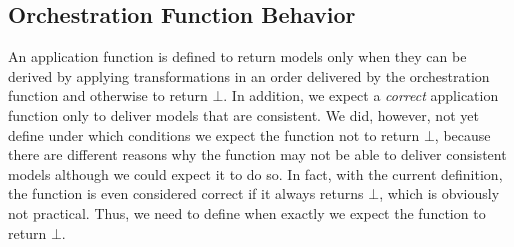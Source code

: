 \subsection{Orchestration Function Behavior} %
\label{chap:orchestration:problem:function_behavior}

An application function is defined to return models only when they can be derived by applying transformations in an order delivered by the orchestration function and otherwise to return $\bot$.
In addition, we expect a \emph{correct} application function only to deliver models that are consistent.
We did, however, not yet define under which conditions we expect the function not to return $\bot$, because there are different reasons why the function may not be able to deliver consistent models although we could expect it to do so.
In fact, with the current definition, the function is even considered correct if it always returns $\bot$, which is obviously not practical.
Thus, we need to define when exactly we expect the function to return $\bot$.

